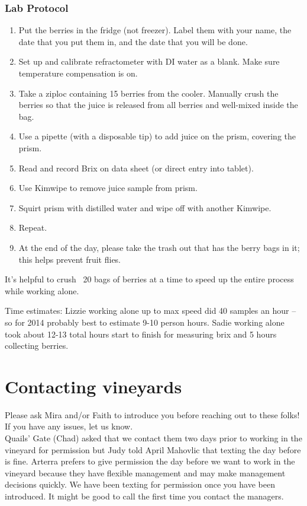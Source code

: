 \documentclass[11pt,letter]{article}
\begin{document}
\subsubsection{Lab Protocol}
\begin{enumerate}
\item Put the berries in the fridge (not freezer). Label them with your name, the date that you put them in, and the date that you will be done.
\item Set up and calibrate refractometer with DI water as a blank. Make sure temperature compensation is on. 
\item Take a ziploc containing 15 berries from the cooler. Manually crush the berries so that the juice is released from all berries and well-mixed inside the bag. 
\item Use a pipette (with a disposable tip) to add juice on the prism, covering the prism. %
\item Read and record Brix on data sheet (or direct entry into tablet).   
\item Use Kimwipe to remove juice sample from prism. 
\item Squirt prism with distilled water and wipe off with another Kimwipe. 
\item Repeat. 
\item At the end of the day, please take the trash out that has the berry bags in it; this helps prevent fruit flies.
\end{enumerate}

It’s helpful to crush ~20 bags of berries at a time to speed up the entire process while working alone. %

Time estimates: Lizzie working alone up to max speed did 40 samples an hour -- so for 2014 probably best to estimate 9-10 person hours. Sadie working alone took about 12-13 total hours start to finish for measuring brix and 5 hours collecting berries. 

\section{Contacting vineyards}
Please ask Mira and/or Faith to introduce you before reaching out to these folks! If you have any issues, let us know.\\

Quails' Gate (Chad) asked that we contact them two days prior to working in the vineyard for permission but Judy told April Mahovlic that texting the day before is fine. Arterra prefers to give permission the day before we want to work in the vineyard because they have flexible management and may make management decisions quickly. We have been texting for permission once you have been introduced. It might be good to call the first time you contact the managers. \\
\end{document}
